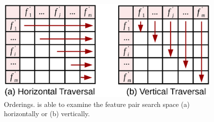 
\begin{figure}[h]
 \centering
 \vspace{-5mm}
 \includegraphics[width=0.8\linewidth]{fig/traversal.eps}
 \vspace{-5mm}
\caption{\traversal Orderings. \genviz is able to examine the feature pair search space (a) horizontally or (b) vertically.}
\vspace{-5mm}
\label{fig:traversal}
\end{figure}




